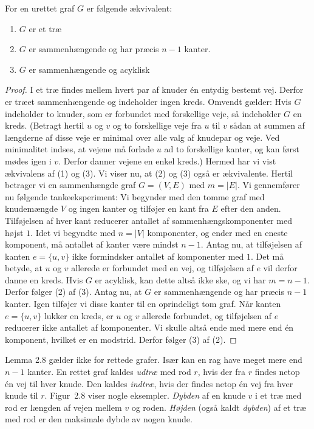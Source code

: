 \begin{lem}
  For en urettet graf $G$ er følgende ækvivalent:
  \begin{enumerate}[(1)]
    \item $G$ er et træ
    \item $G$ er sammenhængende og har præcis $n-1$ kanter.
    \item $G$ er sammenhængende og acyklisk
  \end{enumerate}

\end{lem}
\begin{proof}
I et træ findes mellem hvert par af knuder én entydig bestemt vej.
Derfor er træet sammenhængende og indeholder ingen kreds.
Omvendt gælder:
Hvis $G$ indeholder to knuder, som er forbundet med forskellige veje, så indeholder $G$ en kreds.
(Betragt hertil $u$ og $v$ og to forskellige veje fra $u$ til $v$ sådan at summen af længderne af disse veje er minimal over alle valg af knudepar og veje.
Ved minimalitet indses, at vejene må forlade $u$ ad to forskellige kanter, og kan først mødes igen i $v$.
Derfor danner vejene en enkel kreds.)
Hermed har vi vist ækvivalens af (1) og (3).
Vi viser nu, at (2) og (3) også er ækvivalente.
Hertil betrager vi en sammenhængde graf $G=(V,E)$ med $m=|E|$.
Vi gennemfører nu følgende tankeeksperiment:
Vi begynder med den tomme graf
med knudemængde $V$ og ingen kanter og tilføjer en kant fra $E$ efter den anden.
Tilføjelsen af hver kant reducerer antallet af sammenhængskomponenter med højst $1$.
Idet vi begyndte med $n=|V|$ komponenter, og ender med en eneste komponent, må antallet af kanter være mindst $n-1$.
Antag nu, at tilføjelsen af kanten $e=\{u,v\}$ ikke formindsker antallet af komponenter med $1$.
Det må betyde, at $u$ og $v$ allerede er forbundet med en vej, og tilføjelsen af $e$ vil derfor danne en kreds.
Hvis $G$ er acyklisk, kan dette altså ikke ske, og vi har $m=n-1$.
Derfor følger (2) af (3).
Antag nu, at $G$ er sammenhængende og har præcis $n-1$ kanter.
Igen tilføjer vi disse kanter til en oprindeligt tom graf.
Når kanten $e=\{u,v\}$ lukker en kreds, er $u$ og $v$ allerede forbundet, og tilføjelsen af $e$ reducerer ikke antallet af komponenter.
Vi skulle altså ende med mere end én komponent, hvilket er en modstrid.
Derfor følger (3) af (2).
\end{proof}

Lemma 2.8 gælder ikke for rettede grafer.
Især kan en rag have meget mere end $n-1$ kanter.
En rettet graf kaldes \emph{udtræ}
med rod $r$,
hvis der fra $r$ findes netop én vej til hver knude.
Den kaldes \emph{indtræ},
hvis der findes netop én vej fra hver knude til $r$.
Figur~2.8 viser nogle eksempler.
\emph{Dybden}
af en knude $v$ i et træ med rod er længden af vejen mellem $v$ og roden.
\emph{Højden}
(også kaldt \emph{dybden}) af et træ med rod er den maksimale dybde av nogen knude.

